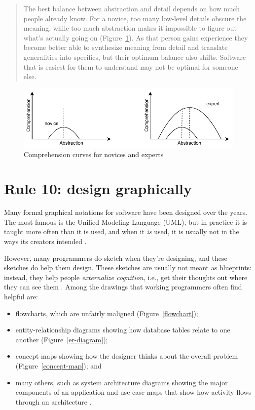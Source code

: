 \documentclass[10pt,letterpaper]{article}
\begin{document}
\begin{quotation}
  The best balance between abstraction and detail
  depends on how much people already know.
  For a novice,
  too many low-level details obscure the meaning,
  while too much abstraction makes it impossible to figure out what's actually going on
  (Figure~\ref{comprehension}).
  As that person gains experience
  they become better able to synthesize meaning from detail
  and translate generalities into specifics,
  but their optimum balance also shifts.
  Software that is easiest for them to understand may not be optimal for someone else.
\end{quotation}

\begin{figure}
  \centering
  \includegraphics{comprehension.pdf}
  \caption{Comprehension curves for novices and experts}
  \label{comprehension}
\end{figure}

\section*{Rule 10: design graphically}

Many formal graphical notations for software have been designed over the years.
The most famous is the Unified Modeling Language (UML),
but in practice it is taught more often than it is used,
and when it \emph{is} used,
it is usually not in the ways its creators intended \cite{Petre2013}.

However,
many programmers do sketch when they're designing,
and these sketches do help them design.
These sketches are usually not meant as blueprints:
instead,
they help people \emph{externalize cognition},
i.e.,
get their thoughts out where they can see them \cite{Cherubini2007,Petre2016}.
Among the drawings that working programmers often find helpful are:

\begin{itemize}
\item
  flowcharts, which are unfairly maligned \cite{Scanlan1989}
  (Figure~\ref{flowchart});
\item
  entity-relationship diagrams showing how database tables relate to one another
  (Figure~\ref{er-diagram});
\item
  concept maps showing how the designer thinks about the overall problem
  (Figure~\ref{concept-map}); and
\item
  many others,
  such as system architecture diagrams showing the major components of an application
  and use case maps that show how activity flows through an architecture \cite{Reekie2006}.
\end{itemize}
\end{document}
